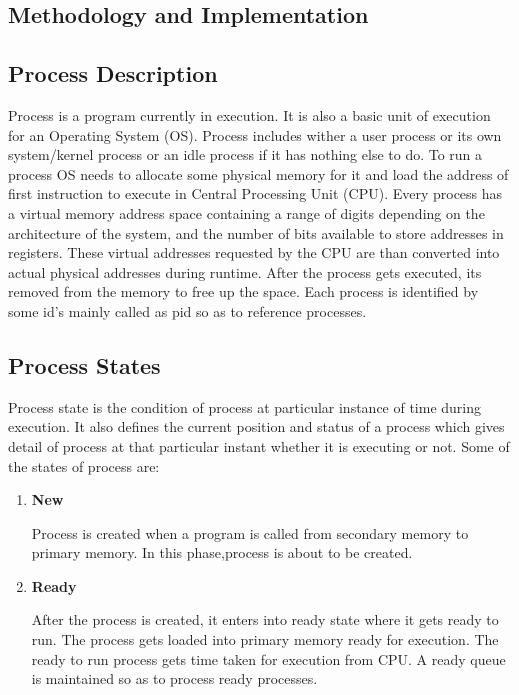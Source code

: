 \begin{onehalfspacing}
\chapter{Methodology and Implementation}
\section{Process Description}
Process is a program currently in execution. It is also a basic unit of execution for an Operating System (OS). Process includes wither a user process or its own system/kernel process or an idle process if it has nothing else to do. To run a process OS needs to allocate some physical memory for it and load the address of first instruction to execute in Central Processing Unit (CPU). Every process has a virtual memory address space containing a range of digits depending on the architecture of the system, and the number of bits available to store addresses in registers. These virtual addresses requested by the CPU are than converted into actual physical addresses during runtime. After the process gets executed, its removed from the memory to free up the space. Each process is identified by some id's mainly called as pid so as to reference processes. 

\section{Process States}
Process state is the condition of process at particular instance of time during execution. It also defines the current position and status of a process which gives detail of process at that particular instant whether it is executing or not. Some of the states of process are:
\begin{enumerate}

    \item \textbf{New}
    \par Process is created when a program is called from secondary memory to primary memory. In this phase,process is about to be created.
    
    \item  \textbf{Ready}
    \par After the process is created, it enters into ready state where it gets ready to run. The process gets loaded into primary memory ready for execution. The ready to run process gets time taken for execution from CPU. A ready queue is maintained so as to process ready processes.
    

\end{enumerate}
\end{onehalfspacing}
